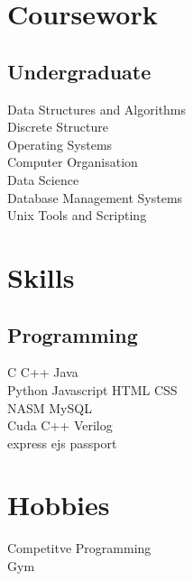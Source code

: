 \documentclass[]{deedy-resume-openfont}
\begin{document}
\begin{minipage}[t]{0.33\textwidth}

\section{Coursework}

\subsection{Undergraduate}
Data Structures and Algorithms \\
Discrete Structure \\
Operating Systems \\
Computer Organisation \\
Data Science \\
Database Management Systems \\
Unix Tools and Scripting \\


\section{Skills}
\subsection{Programming}
C \textbullet{} C++ \textbullet{} Java  \\ 
Python \textbullet{} Javascript \textbullet{} HTML \textbullet{} CSS\\
NASM \textbullet{} MySQL \\
Cuda C++ \textbullet{} Verilog\\ 
express \textbullet{} ejs \textbullet{} passport
\sectionsep



\section{Hobbies}
Competitve Programming \\ 
Gym \\ 
\sectionsep


%
%

\end{minipage} 
\end{document}

